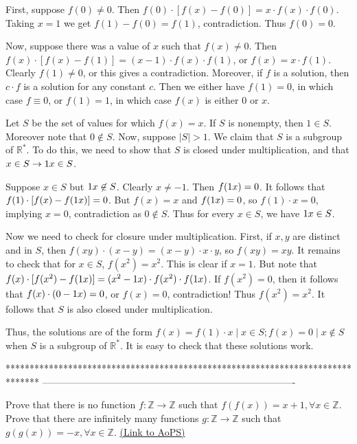 \begin{solution}
	First, suppose $f(0)\neq 0$. Then $f(0)\cdot [f(x)-f(0)] = x\cdot f(x)\cdot f(0)$. Taking $x=1$ we get $f(1)-f(0)=f(1)$, contradiction. Thus $f(0)=0$.

Now, suppose there was a value of $x$ such that $f(x)\neq 0$. Then $f(x)\cdot [f(x)-f(1)] = (x-1)\cdot f(x)\cdot f(1)$, or $f(x)=x\cdot f(1)$. Clearly $f(1)\neq 0$, or this gives a contradiction. Moreover, if $f$ is a solution, then $c\cdot f$ is a solution for any constant $c$. Then we either have $f(1)=0$, in which case $f\equiv 0$, or $f(1)=1$, in which case $f(x)$ is either $0$ or $x$.

Let $S$ be the set of values for which $f(x)=x$. If $S$ is nonempty, then $1\in S$. Moreover note that $0\not\in S$. Now, suppose $|S|>1$. We claim that $S$ is a subgroup of $\mathbb{R}^*$. To do this, we need to show that $S$ is closed under multiplication, and that $x\in S\rightarrow 1\/x\in S$.

Suppose $x\in S$ but $1\/x\not\in S$. Clearly $x\neq -1$. Then $f(1\/x)=0$. It follows that $f(1)\cdot [f(x)-f(1\/x)] = 0$. But $f(x)=x$ and $f(1\/x)=0$, so $f(1)\cdot x = 0$, implying $x=0$, contradiction as $0\not\in S$. Thus for every $x\in S$, we have $1\/x\in S$.

Now we need to check for closure under multiplication. First, if $x,y$ are distinct and in $S$, then $f(xy)\cdot (x-y) = (x-y)\cdot x\cdot y$, so $f(xy)=xy$. It remains to check that for $x\in S$, $f(x^2)=x^2$. This is clear if $x=1$. But note that $f(x)\cdot [f(x^2)-f(1\/x)] = (x^2-1\/x)\cdot f(x^2)\cdot f(1\/x)$. If $f(x^2)=0$, then it follows that $f(x)\cdot (0-1\/x)=0$, or $f(x)=0$, contradiction! Thus $f(x^2)=x^2$. It follows that $S$ is also closed under multiplication.

Thus, the solutions are of the form $\boxed{f(x)=f(1)\cdot x \mid x\in S; f(x) = 0 \mid  x\not\in S}$ when $S$ is a subgroup of $\mathbb{R}^*$. It is easy to check that these solutions work. 
\end{solution}
*******************************************************************************
-------------------------------------------------------------------------------

\begin{problem}
	Prove that there is no function $f:\mathbb {Z}\rightarrow \mathbb {Z}$ such that $f(f(x))=x+1, \forall x\in \mathbb {Z}.$
Prove that there are infinitely many functions $g:\mathbb {Z}\rightarrow \mathbb {Z}$ such that $g(g(x))=-x, \forall x\in \mathbb {Z}.$
	\flushright \href{https://artofproblemsolving.com/community/c6h28101}{(Link to AoPS)}
\end{problem}



